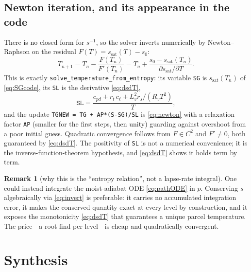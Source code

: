 \documentclass[11pt,a4paper]{article}
\theoremstyle{definition}
\newtheorem{remark}{Remark}
\newcommand{\Rv}{R_v}
\newcommand{\cpd}{c_{pd}}
\newcommand{\cl}{c_\ell}
\newcommand{\Lv}{L_v}
\newcommand{\rt}{r_t}
\begin{document}
\subsection{Newton iteration, and its appearance in the code}

There is no closed form for $s^{-1}$, so the solver inverts numerically by
Newton--Raphson on the residual $F(T)=s_{\mathrm{sat}}(T)-s_0$:
\begin{equation}\label{eq:newton}
T_{n+1}=T_n-\frac{F(T_n)}{F'(T_n)}
       =T_n+\frac{s_0-s_{\mathrm{sat}}(T_n)}{\partial s_{\mathrm{sat}}/\partial T}.
\end{equation}
This is exactly \texttt{solve\_temperature\_from\_entropy}: its variable
\texttt{SG} is $s_{\mathrm{sat}}(T_n)$ of \eqref{eq:SGcode}, its \texttt{SL} is
the derivative \eqref{eq:dsdT},
\[
\texttt{SL}=\frac{\cpd+\rt\,\cl+\Lv^2 r_s/(\Rv T^2)}{T},
\]
and the update \texttt{TGNEW = TG + AP*(S-SG)/SL} is \eqref{eq:newton} with a
relaxation factor \texttt{AP} (smaller for the first steps, then unity) guarding
against overshoot from a poor initial guess. Quadratic convergence follows from
$F\in C^2$ and $F'\neq0$, both guaranteed by \eqref{eq:dsdT}. The positivity of
\texttt{SL} is not a numerical convenience; it is the inverse-function-theorem
hypothesis, and \eqref{eq:dsdT} shows it holds term by term.

\begin{remark}[why this is the ``entropy relation'', not a lapse-rate integral]
One could instead integrate the moist-adiabat ODE \eqref{eq:pathODE} in $p$.
Conserving $s$ algebraically via \eqref{eq:invert} is preferable: it carries no
accumulated integration error, it makes the conserved quantity exact at every
level by construction, and it exposes the monotonicity \eqref{eq:dsdT} that
guarantees a unique parcel temperature. The price---a root-find per level---is
cheap and quadratically convergent.
\end{remark}

\section{Synthesis}\label{sec:synthesis}
\end{document}
